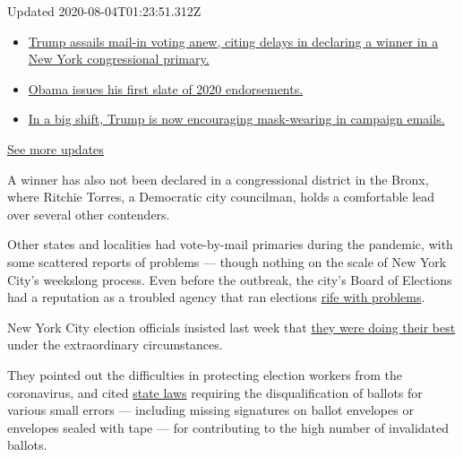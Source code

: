 Updated 2020-08-04T01:23:51.312Z

\begin{itemize}
\tightlist
\item
  \href{https://www.nytimes3xbfgragh.onion/2020/08/03/us/elections/biden-vs-trump.html?action=click\&pgtype=Article\&state=default\&region=MAIN_CONTENT_1\&context=storylines_live_updates\#link-6494b448}{Trump
  assails mail-in voting anew, citing delays in declaring a winner in a
  New York congressional primary.}
\item
  \href{https://www.nytimes3xbfgragh.onion/2020/08/03/us/elections/biden-vs-trump.html?action=click\&pgtype=Article\&state=default\&region=MAIN_CONTENT_1\&context=storylines_live_updates\#link-3de249e6}{Obama
  issues his first slate of 2020 endorsements.}
\item
  \href{https://www.nytimes3xbfgragh.onion/2020/08/03/us/elections/biden-vs-trump.html?action=click\&pgtype=Article\&state=default\&region=MAIN_CONTENT_1\&context=storylines_live_updates\#link-54e34d20}{In
  a big shift, Trump is now encouraging mask-wearing in campaign
  emails.}
\end{itemize}

\href{https://www.nytimes3xbfgragh.onion/2020/08/03/us/elections/biden-vs-trump.html?action=click\&pgtype=Article\&state=default\&region=MAIN_CONTENT_1\&context=storylines_live_updates}{See
more updates}

A winner has also not been declared in a congressional district in the
Bronx, where Ritchie Torres, a Democratic city councilman, holds a
comfortable lead over several other contenders.

Other states and localities had vote-by-mail primaries during the
pandemic, with some scattered reports of problems --- though nothing on
the scale of New York City's weekslong process. Even before the
outbreak, the city's Board of Elections had a reputation as a troubled
agency that ran elections
\href{https://www.nytimes3xbfgragh.onion/2018/11/07/nyregion/voting-problems-nyc-.html}{rife
with problems}.

New York City election officials insisted last week that
\href{https://www.nytimes3xbfgragh.onion/2020/07/17/nyregion/election-absentee-ballots-primary.html}{they
were doing their best} under the extraordinary circumstances.

They pointed out the difficulties in protecting election workers from
the coronavirus, and cited
\href{https://www.nysenate.gov/legislation/laws/ELN/9-209}{state laws}
requiring the disqualification of ballots for various small errors ---
including missing signatures on ballot envelopes or envelopes sealed
with tape --- for contributing to the high number of invalidated
ballots.

